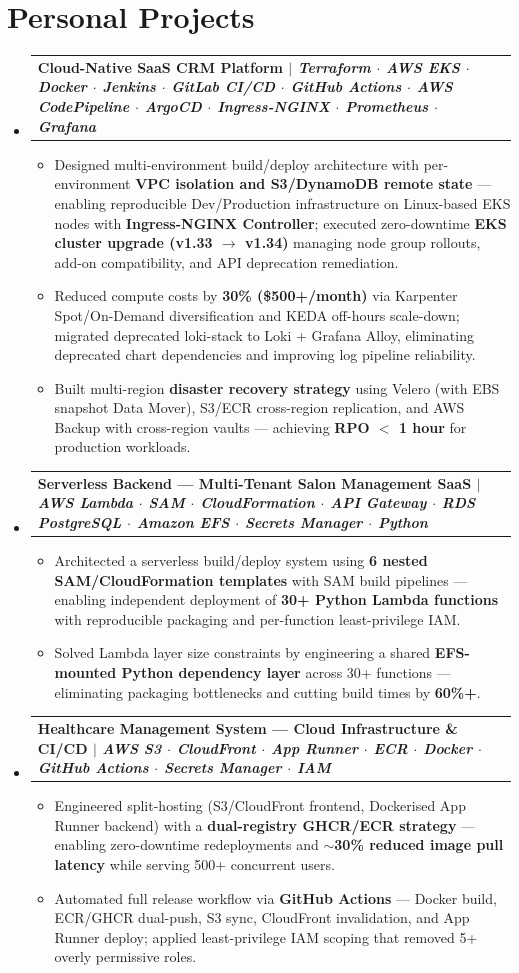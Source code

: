\documentclass[letterpaper,11pt]{article}
\makeatletter
\newcommand{\resumeItem}[1]{
  \item\small{
    {#1 \vspace{-3pt}}
  }
}
\newcommand{\resumeProjectHeading}[2]{
  \vspace{-3pt}\item
    \begin{tabular*}{1.0\textwidth}[t]{l@{\extracolsep{\fill}}r}
      \textbf{#1} & \textbf{\small #2} \\
    \end{tabular*}\vspace{-7pt}
}
\newcommand{\resumeSubHeadingListStart}{\begin{itemize}[leftmargin=0.0in, label={}]}
\newcommand{\resumeSubHeadingListEnd}{\end{itemize}}
\newcommand{\resumeItemListStart}{\begin{itemize}}
\newcommand{\resumeItemListEnd}{\end{itemize}\vspace{0pt}}
\makeatother
\begin{document}
\section{Personal Projects}
\resumeSubHeadingListStart
    \resumeProjectHeading
      {\textbf{Cloud-Native SaaS CRM Platform} $|$ \emph{Terraform $\cdot$ AWS EKS $\cdot$ Docker $\cdot$ Jenkins $\cdot$ GitLab CI/CD $\cdot$ GitHub Actions $\cdot$ AWS CodePipeline $\cdot$ ArgoCD $\cdot$ Ingress-NGINX $\cdot$ Prometheus $\cdot$ Grafana}}{}
      \resumeItemListStart
        \resumeItem{Designed multi-environment build/deploy architecture with per-environment \textbf{VPC isolation and S3/DynamoDB remote state} --- enabling reproducible Dev/Production infrastructure on Linux-based EKS nodes with \textbf{Ingress-NGINX Controller}; executed zero-downtime \textbf{EKS cluster upgrade (v1.33 $\rightarrow$ v1.34)} managing node group rollouts, add-on compatibility, and API deprecation remediation.}
        \resumeItem{Reduced compute costs by \textbf{30\% (\$500+/month)} via Karpenter Spot/On-Demand diversification and KEDA off-hours scale-down; migrated deprecated loki-stack to Loki + Grafana Alloy, eliminating deprecated chart dependencies and improving log pipeline reliability.}
        \resumeItem{Built multi-region \textbf{disaster recovery strategy} using Velero (with EBS snapshot Data Mover), S3/ECR cross-region replication, and AWS Backup with cross-region vaults --- achieving \textbf{RPO $<$ 1 hour} for production workloads.}
      \resumeItemListEnd
    \resumeProjectHeading
      {\textbf{Serverless Backend --- Multi-Tenant Salon Management SaaS} $|$ \emph{AWS Lambda $\cdot$ SAM $\cdot$ CloudFormation $\cdot$ API Gateway $\cdot$ RDS PostgreSQL $\cdot$ Amazon EFS $\cdot$ Secrets Manager $\cdot$ Python}}{}
      \resumeItemListStart
        \resumeItem{Architected a serverless build/deploy system using \textbf{6 nested SAM/CloudFormation templates} with SAM build pipelines --- enabling independent deployment of \textbf{30+ Python Lambda functions} with reproducible packaging and per-function least-privilege IAM.}
        \resumeItem{Solved Lambda layer size constraints by engineering a shared \textbf{EFS-mounted Python dependency layer} across 30+ functions --- eliminating packaging bottlenecks and cutting build times by \textbf{60\%+}.}
      \resumeItemListEnd
    \resumeProjectHeading
      {\textbf{Healthcare Management System --- Cloud Infrastructure \& CI/CD} $|$ \emph{AWS S3 $\cdot$ CloudFront $\cdot$ App Runner $\cdot$ ECR $\cdot$ Docker $\cdot$ GitHub Actions $\cdot$ Secrets Manager $\cdot$ IAM}}{}
      \resumeItemListStart
        \resumeItem{Engineered split-hosting (S3/CloudFront frontend, Dockerised App Runner backend) with a \textbf{dual-registry GHCR/ECR strategy} --- enabling zero-downtime redeployments and \textbf{$\sim$30\% reduced image pull latency} while serving 500+ concurrent users.}
        \resumeItem{Automated full release workflow via \textbf{GitHub Actions} --- Docker build, ECR/GHCR dual-push, S3 sync, CloudFront invalidation, and App Runner deploy; applied least-privilege IAM scoping that removed 5+ overly permissive roles.}
      \resumeItemListEnd
\resumeSubHeadingListEnd
\end{document}
